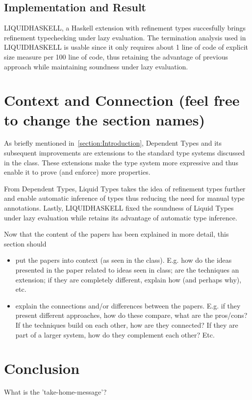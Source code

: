 \documentclass[a4paper,UKenglish]{lipics-v2016}
\begin{document}
    \subsection{Implementation and Result}
      
      LIQUIDHASKELL, a Haskell extension with refinement types succesfully
      brings refinement typechecking under lazy evaluation.  The termination
      analysis used in LIQUIDHASKELL is usable since it only requires about 1
      line of code of explicit size measure per 100 line of code, thus
      retaining the advantage of previous approach while maintaining soundness
      under lazy evaluation.

\section{Context and Connection (feel free to change the section names)}

  As briefly mentioned in~\ref{section:Introduction}, Dependent Types and its
  subsequent improvements are extensions to the standard type systems discussed
  in the class.  These extensions make the type system more expressive and thus
  enable it to prove (and enforce) more properties.

  From Dependent Types, Liquid Types takes the idea of refinement types further
  and enable automatic inference of types thus reducing the need for manual
  type annotations.  Lastly, LIQUIDHASKELL fixed the soundness of Liquid Types
  under lazy evaluation while retains its advantage of automatic type
  inference.

  Now that the content of the papers has been explained in more detail,
  this section should
  \begin{itemize}
    \item put the papers into context (as seen in the class). E.g. how do the
    ideas presented in the paper related to ideas seen in class; are the techniques
    an extension; if they are completely different, explain how (and perhaps why), etc.

    \item explain the connections and/or differences between the papers.
      E.g. if they present different approaches, how do these compare, what are the pros/cons?
      If the techniques build on each other, how are they connected?
      If they are part of a larger system, how do they complement each other?
      Etc.

  \end{itemize}

\section{Conclusion}

  What is the 'take-home-message'?





\end{document}
